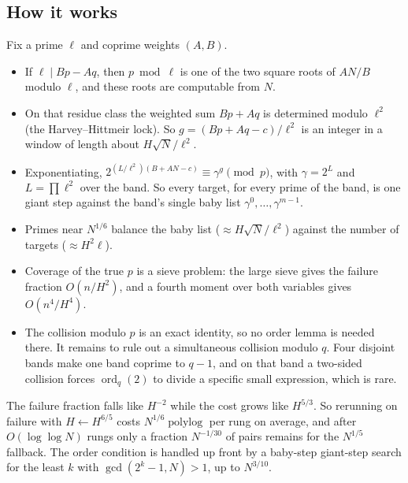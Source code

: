 \documentclass[11pt]{amsart}
\theoremstyle{definition}
\newcommand{\ord}{\operatorname{ord}}
\newcommand{\polylog}{\operatorname{polylog}}
\begin{document}
\subsection{How it works}
Fix a prime $\ell$ and coprime weights $(A,B)$.
\begin{itemize}
\item If $\ell\mid Bp-Aq$, then $p\bmod\ell$ is one of the two square roots of $AN/B$ modulo
  $\ell$, and these roots are computable from $N$.
\item On that residue class the weighted sum $Bp+Aq$ is determined modulo $\ell^2$ (the
  Harvey--Hittmeir lock). So $g=(Bp+Aq-c)/\ell^2$ is an integer in a window of length about
  $H\sqrt N/\ell^2$.
\item Exponentiating, $2^{(L/\ell^2)(B+AN-c)}\equiv\gamma^{g}\pmod p$, with $\gamma=2^{L}$ and
  $L=\prod\ell^2$ over the band. So every target, for every prime of the band, is one giant step
  against the band's single baby list $\gamma^0,\dots,\gamma^{m-1}$.
\item Primes near $N^{1/6}$ balance the baby list ($\approx H\sqrt N/\ell^2$) against the number
  of targets ($\approx H^2\ell$).
\item Coverage of the true $p$ is a sieve problem: the large sieve gives the failure fraction
  $O(n/H^2)$, and a fourth moment over both variables gives $O(n^4/H^4)$.
\item The collision modulo $p$ is an exact identity, so no order lemma is needed there. It
  remains to rule out a simultaneous collision modulo $q$. Four disjoint bands make one band
  coprime to $q-1$, and on that band a two-sided collision forces $\ord_q(2)$ to divide a
  specific small expression, which is rare.
\end{itemize}
The failure fraction falls like $H^{-2}$ while the cost grows like $H^{5/3}$. So rerunning on
failure with $H\leftarrow H^{6/5}$ costs $N^{1/6}\polylog$ per rung on average, and after
$O(\log\log N)$ rungs only a fraction $N^{-1/30}$ of pairs remains for the $N^{1/5}$ fallback.
The order condition is handled up front by a baby-step giant-step search for the least $k$ with
$\gcd(2^k-1,N)>1$, up to $N^{3/10}$.
\end{document}
